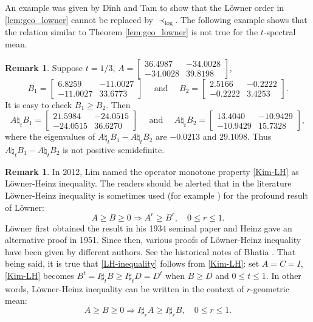 \documentclass[12pt, reqno]{amsart}
\numberwithin{equation}{section}
\theoremstyle{definition}
\newtheorem{remark}[theorem]{Remark}
\renewcommand{\ge}{\geqslant}
\renewcommand{\le}{\leqslant}
\begin{document}
An example was given by Dinh and Tam \cite [p.778]{DAT16} to show that the L{\"{o}}wner order in \eqref{lem:geo_lowner} cannot be replaced by $\prec_{\log}$.  The following example shows that the relation similar to Theorem \ref{lem:geo_lowner} is not true for the $t$-spectral mean.

\begin{remark}
Suppose $t=1/3$, $A=
\begin{bmatrix}
36.4987 & -34.0028\\
 -34.0028  & 39.8198
\end{bmatrix}$,
\[
B_1 = 
\begin{bmatrix}
6.8259  &-11.0027\\
-11.0027   &33.6773
\end{bmatrix} 
\quad \text{ and }
\quad
B_2 = 
\begin{bmatrix}
2.5166 &  -0.2222\\
-0.2222  &  3.4253	
\end{bmatrix}.
\]
It is easy to check $B_1\ge B_2$. Then
\[
A\natural_t B_1 = 
\begin{bmatrix}
21.5984 & -24.0515\\
  -24.0515  & 36.6270
\end{bmatrix} \quad \text{ and }
\quad
A\natural_t B_2 = 
\begin{bmatrix}
13.4040 & -10.9429\\
  -10.9429  & 15.7328	
\end{bmatrix},
\]
where the eigenvalues of $A\natural_t B_1-A\natural_t B_2$ are $-0.0213$ and $29.1098$.
Thus $A\natural_t B_1-A\natural_t B_2$ is not positive semidefinite.
\end{remark}

\begin{remark}
In 2012, Lim \cite{Li12} named the operator monotone property \eqref{Kim-LH} as L{\"{o}}wner-Heinz inequality. The readers should be alerted that in the literature  L{\"{o}}wner-Heinz inequality  is sometimes used (for example \cite [p.2-3]{Z02}) for the profound result of L{\"{o}}wner: 
\begin{equation}\label{LH-inequality}
A\ge B\ge 0 \Rightarrow A^r\ge B^r,\quad 0\le r\le 1.
\end{equation}  
 L{\"{o}}wner \cite{Lo34} first obtained the result in his 1934 seminal paper and Heinz \cite {H51} gave an alternative proof  in 1951. Since then, various  proofs of L{\"{o}}wner-Heinz inequality have been given by different authors. See the historical notes of Bhatia \cite[p.149-150] {Bh97}. That being said, it is true that \eqref{LH-inequality} follows from \eqref{Kim-LH}:
set $A=C=I$,   \eqref{Kim-LH} becomes $B^t = I\sharp_t B \ge  I\sharp_tD = D^t$ when $B\ge D$ and $0\le t\le 1$. In other words, L{\"{o}}wner-Heinz inequality can be written in the context of $r$-geometric mean:
\[
A\ge B\ge 0 \Rightarrow I\sharp_r A\ge I\sharp_r B,\quad 0\le r\le 1.
\]

\end{remark}
\end{document}
